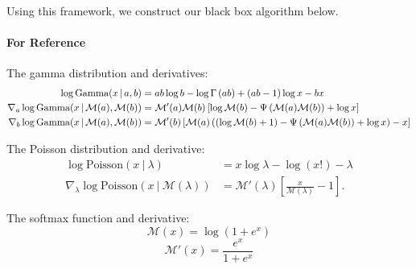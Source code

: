 Using this framework, we construct our black box algorithm below. 

\paragraph{For Reference}
The gamma distribution and derivatives:
\begin{align}
\log\mbox{Gamma}(x \, | \, a,b) & = ab\log b - \log\Gamma \left(ab\right) +(ab-1)\log x - bx \label{eq:gamma}\\
\nabla_a \log\mbox{Gamma}(x \, | \, \mathcal{M}(a), \mathcal{M}(b)) &= 
\mathcal{M}'(a) \mathcal{M}(b) \left[ \log \mathcal{M}(b) - \Psi \left(\mathcal{M}(a)\mathcal{M}(b)\right) + \log x\right] \label{eq:dgammaA}
\\
\nabla_b \log\mbox{Gamma}(x \, | \, \mathcal{M}(a), \mathcal{M}(b)) &= 
\mathcal{M}'(b) \left[ \mathcal{M}(a) \left((\log \mathcal{M}(b) + 1) - \Psi \left(\mathcal{M}(a)\mathcal{M}(b)\right) + \log x\right) - x\right]\label{eq:dgammaB}
\end{align}

The Poisson distribution and derivative:
\begin{align}
\log\mbox{Poisson}(x~\vert~\lambda) &= x\log\lambda - \log(x!) - \lambda \label{eq:poisson} \\
\nabla_\lambda \log\mbox{Poisson}(x~\vert~\mathcal{M}(\lambda)) &= \mathcal{M}'(\lambda)\left[\frac{x}{\mathcal{M}(\lambda)} -1\right].\label{eq:dpoisson}
\end{align}

The softmax function and derivative:
\[\mathcal{M}(x) = \log(1+e^x)\]
\[\mathcal{M}'(x) = \frac{e^x}{1+e^x}\]

